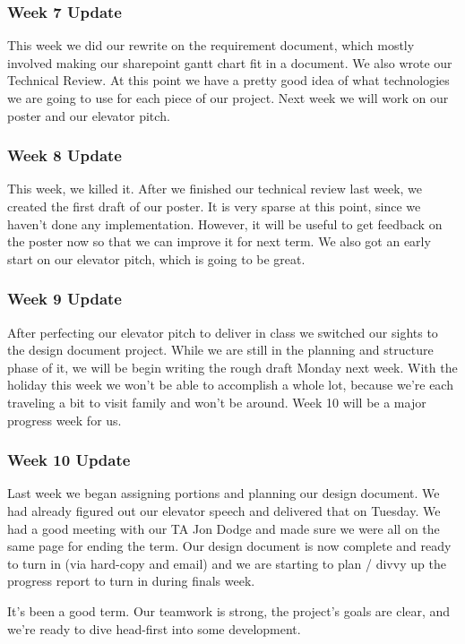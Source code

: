\subsubsection{Week 7 Update}
​This week we did our rewrite on the requirement document, which mostly involved making our sharepoint gantt chart fit in a document.
We also wrote our Technical Review.
At this point we have a pretty good idea of what technologies we are going to use for each piece of our project.​​​ Next week we will work on our poster and our elevator pitch.

\subsubsection{Week 8 Update}
​This week, we killed it.
After we finished our technical review last week, we created the first draft of our poster.
It is very sparse at this point, since we haven't done any implementation.
However, it will be useful to get feedback on the poster now so that we can improve it for next term.
We also got an early start on our elevator pitch, which is going to be great.

\subsubsection{Week 9 Update}
After perfecting our elevator pitch to deliver in class we switched our sights to the design document project.
While we are still in the planning and structure phase of it, we will be begin writing the rough draft Monday next week.
With the holiday this week we won't be able to accomplish a whole lot, because we're each traveling a bit to visit family and won't be around.
Week 10 will be a major progress week for us.

\subsubsection{Week 10 Update}
Last week we began assigning portions and planning our design document.
We had already figured out our elevator speech and delivered that on Tuesday.
We had a good meeting with our TA Jon Dodge and made sure we were all on the same page for ending the term.
Our design document is now complete and ready to turn in (via hard-copy and email) and we are starting to plan / divvy up the progress report to turn in during finals week.

It's been a good term.
Our teamwork is strong, the project's goals are clear, and we're ready to dive head-first into some development.


